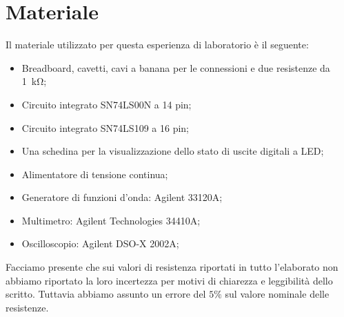 \section*{Materiale}

Il materiale utilizzato per questa esperienza di laboratorio è il seguente:

\begin{itemize} \itemsep2pt \parskip0pt 
    \item{Breadboard, cavetti, cavi a banana per le connessioni e due resistenze da \SI{1}{\kilo\ohm};}
    \item{Circuito integrato SN74LS00N a 14 pin;}
    \item{Circuito integrato SN74LS109 a 16 pin;}
	\item{Una schedina per la visualizzazione dello stato di uscite digitali a LED;}
    \item{Alimentatore di tensione continua;}
    \item{Generatore di funzioni d'onda: Agilent 33120A;}
    \item{Multimetro: Agilent Technologies 34410A;}
    \item{Oscilloscopio: Agilent DSO-X 2002A;}
\end{itemize}

Facciamo presente che sui valori di resistenza riportati in tutto l'elaborato non abbiamo riportato la loro incertezza per motivi di chiarezza e leggibilità dello scritto. Tuttavia abbiamo assunto un errore del $5\%$ sul valore nominale delle resistenze.
